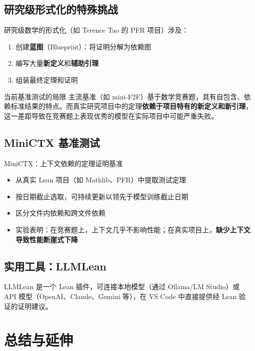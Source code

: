 \documentclass[a4paper]{article}
\begin{document}
\subsection{研究级形式化的特殊挑战}

研究级数学的形式化（如 Terence Tao 的 PFR 项目）涉及：
\begin{enumerate}
    \item 创建\textbf{蓝图}（Blueprint）：将证明分解为依赖图
    \item 编写大量\textbf{新定义}和\textbf{辅助引理}
    \item 组装最终定理和证明
\end{enumerate}

\begin{warningbox}{当前基准测试的局限}
主流基准（如 mini-F2F）基于数学竞赛题，具有自包含、依赖标准结果的特点。而真实研究项目中的定理\textbf{依赖于项目特有的新定义和新引理}，这一差距导致在竞赛题上表现优秀的模型在实际项目中可能严重失败。
\end{warningbox}

\subsection{MiniCTX 基准测试}

\begin{importantbox}{MiniCTX：上下文依赖的定理证明基准}
\begin{itemize}
    \item 从真实 Lean 项目（如 Mathlib、PFR）中提取测试定理
    \item 按日期截止选取，可持续更新以领先于模型训练截止日期
    \item 区分文件内依赖和跨文件依赖
    \item 实验表明：在竞赛题上，上下文几乎不影响性能；在真实项目上，\textbf{缺少上下文导致性能断崖式下降}
\end{itemize}
\end{importantbox}

\subsection{实用工具：LLMLean}

LLMLean 是一个 Lean 插件，可连接本地模型（通过 Ollama/LM Studio）或 API 模型（OpenAI、Claude、Gemini 等），在 VS Code 中直接提供经 Lean 验证的证明建议。

\section{总结与延伸}
\end{document}
